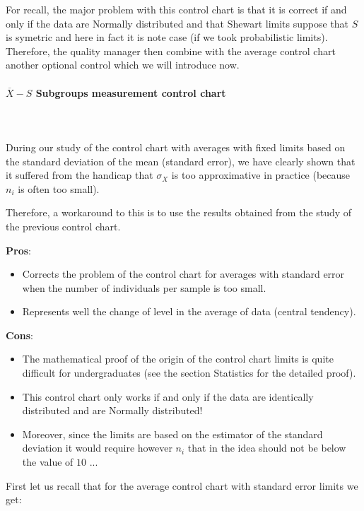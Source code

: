 	For recall, the major problem with this control chart is that it is correct if and only if the data are Normally distributed and that Shewart limits suppose that $S$ is symetric and here in fact it is note case (if we took probabilistic limits). Therefore, the quality manager then combine with the average control chart another optional control which we will introduce now.
	
	\pagebreak
	\paragraph{$\overline{X}-S$ Subgroups measurement control chart}\mbox{}\\\\
	During our study of the control chart with averages with fixed limits based on the standard deviation of the mean (standard error), we have clearly shown that it suffered from the handicap that $\sigma_X$ is too approximative in practice (because $n_i$ is often too small).

	Therefore, a workaround to this is to use the results obtained from the study of the previous control chart.
	
	\textbf{Pros}:
	\begin{itemize}
		\item Corrects the problem of the control chart for averages with standard error when the number of individuals per sample is too small. 

		\item Represents well the change of level in the average of data (central tendency).
	\end{itemize}

	\textbf{Cons}:
	\begin{itemize}
		\item The mathematical proof of the origin of the control chart limits is quite difficult for undergraduates (see the section Statistics for the detailed proof).  

		\item This control chart only works if and only if the data are identically distributed and are Normally distributed! 
		
		\item Moreover, since the limits are based on the estimator of the standard deviation it would require however $n_i$ that in the idea should not be below the value of $10$ ...
 	\end{itemize}
 	First let us recall that for the average control chart with standard error limits we get:
	
